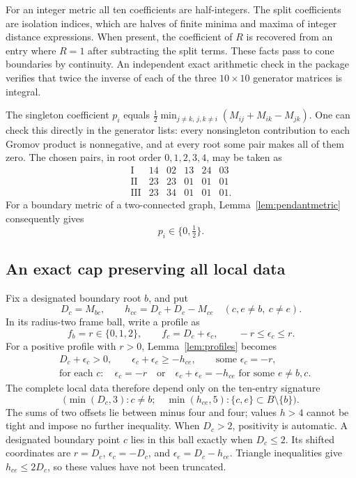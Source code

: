 For an integer metric all ten coefficients are half-integers. The split
coefficients are isolation indices, which are halves of finite minima and
maxima of integer distance expressions. When present, the coefficient of
$R$ is recovered from an entry where $R=1$ after subtracting the split
terms. These facts pass to cone boundaries by continuity. An independent
exact arithmetic check in the package verifies that twice the inverse
of each of the three $10\times10$ generator matrices is integral.

The singleton coefficient $p_i$ equals
$\tfrac12\min_{j\ne k,\,j,k\ne i}(M_{ij}+M_{ik}-M_{jk})$.
One can check this directly in the generator lists: every nonsingleton
contribution to each Gromov product is nonnegative, and at every root
some pair makes all of them zero. The chosen pairs, in root order
$0,1,2,3,4$, may be taken as
\[
\begin{array}{c|ccccc}
 \mathrm{I}&14&02&13&24&03\\
 \mathrm{II}&23&23&01&01&01\\
 \mathrm{III}&23&34&01&01&01.
\end{array}
\]
For a boundary metric of a two-connected graph,
Lemma~\ref{lem:pendantmetric} consequently gives
\begin{equation}\label{eq:pendantcoeff}
 p_i\in\{0,\tfrac12\}.
\end{equation}

\subsection{An exact cap preserving all local data}
Fix a designated boundary root $b$, and put
\[
 D_c=M_{bc},\qquad h_{ce}=D_c+D_e-M_{ce}\quad(c,e\ne b,\ c\ne e).
\]
In its radius-two frame ball, write a profile as
\[
 f_b=r\in\{0,1,2\},\qquad f_c=D_c+\epsilon_c,
 \qquad -r\le\epsilon_c\le r.
\]
For a positive profile with $r>0$, Lemma~\ref{lem:profiles} becomes
\begin{align*}
 &D_c+\epsilon_c>0,\qquad
 \epsilon_c+\epsilon_e\ge-h_{ce},\qquad
 \text{some }\epsilon_c=-r,\\
 &\text{for each }c:\quad
 \epsilon_c=-r\quad\text{or}\quad
 \epsilon_c+\epsilon_e=-h_{ce}\text{ for some }e\ne b,c.
\end{align*}
The complete local data therefore depend only on the ten-entry signature
\begin{equation}\label{eq:signature}
 \bigl(\min(D_c,3):c\ne b;\quad
       \min(h_{ce},5):\{c,e\}\subset B\setminus\{b\}\bigr).
\end{equation}
The sums of two offsets lie between minus four and four; values $h>4$
cannot be tight and impose no further inequality. When $D_c>2$,
positivity is automatic. A designated boundary point $c$ lies in this
ball exactly when $D_c\le2$. Its shifted coordinates are
$r=D_c$, $\epsilon_c=-D_c$, and
$\epsilon_e=D_c-h_{ce}$. Triangle inequalities give $h_{ce}\le2D_c$,
so these values have not been truncated.

